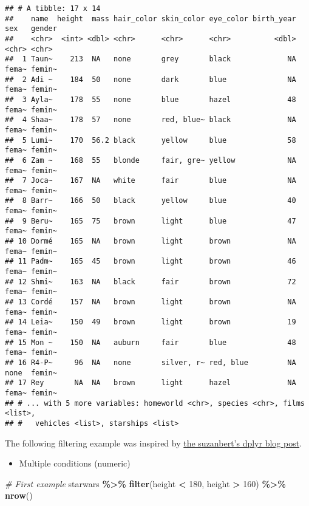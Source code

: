 \documentclass[
]{book}
\newenvironment{Shaded}{\begin{snugshade}}{\end{snugshade}}
\newcommand{\CommentTok}[1]{\textcolor[rgb]{0.56,0.35,0.01}{\textit{#1}}}
\newcommand{\DecValTok}[1]{\textcolor[rgb]{0.00,0.00,0.81}{#1}}
\newcommand{\KeywordTok}[1]{\textcolor[rgb]{0.13,0.29,0.53}{\textbf{#1}}}
\newcommand{\NormalTok}[1]{#1}
\newcommand{\OperatorTok}[1]{\textcolor[rgb]{0.81,0.36,0.00}{\textbf{#1}}}
\newcommand{\StringTok}[1]{\textcolor[rgb]{0.31,0.60,0.02}{#1}}
\providecommand{\tightlist}{%
  \setlength{\itemsep}{0pt}\setlength{\parskip}{0pt}}
\begin{document}
\begin{verbatim}
## # A tibble: 17 x 14
##    name  height  mass hair_color skin_color eye_color birth_year sex   gender
##    <chr>  <int> <dbl> <chr>      <chr>      <chr>          <dbl> <chr> <chr> 
##  1 Taun~    213  NA   none       grey       black             NA fema~ femin~
##  2 Adi ~    184  50   none       dark       blue              NA fema~ femin~
##  3 Ayla~    178  55   none       blue       hazel             48 fema~ femin~
##  4 Shaa~    178  57   none       red, blue~ black             NA fema~ femin~
##  5 Lumi~    170  56.2 black      yellow     blue              58 fema~ femin~
##  6 Zam ~    168  55   blonde     fair, gre~ yellow            NA fema~ femin~
##  7 Joca~    167  NA   white      fair       blue              NA fema~ femin~
##  8 Barr~    166  50   black      yellow     blue              40 fema~ femin~
##  9 Beru~    165  75   brown      light      blue              47 fema~ femin~
## 10 Dormé    165  NA   brown      light      brown             NA fema~ femin~
## 11 Padm~    165  45   brown      light      brown             46 fema~ femin~
## 12 Shmi~    163  NA   black      fair       brown             72 fema~ femin~
## 13 Cordé    157  NA   brown      light      brown             NA fema~ femin~
## 14 Leia~    150  49   brown      light      brown             19 fema~ femin~
## 15 Mon ~    150  NA   auburn     fair       blue              48 fema~ femin~
## 16 R4-P~     96  NA   none       silver, r~ red, blue         NA none  femin~
## 17 Rey       NA  NA   brown      light      hazel             NA fema~ femin~
## # ... with 5 more variables: homeworld <chr>, species <chr>, films <list>,
## #   vehicles <list>, starships <list>
\end{verbatim}

The following filtering example was inspired by \href{https://suzan.rbind.io/2018/02/dplyr-tutorial-3/}{the suzanbert's dplyr blog post}.

\begin{itemize}
\tightlist
\item
  Multiple conditions (numeric)
\end{itemize}

\begin{Shaded}
\begin{Highlighting}[]
\CommentTok{\# First example}
\NormalTok{starwars }\OperatorTok{\%\textgreater{}\%}
\StringTok{  }\KeywordTok{filter}\NormalTok{(height }\OperatorTok{\textless{}}\StringTok{ }\DecValTok{180}\NormalTok{, height }\OperatorTok{\textgreater{}}\StringTok{ }\DecValTok{160}\NormalTok{) }\OperatorTok{\%\textgreater{}\%}
\StringTok{  }\KeywordTok{nrow}\NormalTok{()}
\end{Highlighting}
\end{Shaded}
\end{document}
